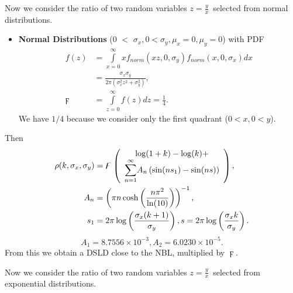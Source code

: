 \documentclass[titlepage,fleqn]{article}%
\begin{document}
Now we consider the ratio of two random variables $z=\frac{y}{x}$\ selected
from normal distributions.

\begin{itemize}
\item \textbf{Normal Distributions} ($0$%
$<$%
$\sigma_{x},0<\sigma_{y},\mu_{x}=0,\mu_{y}=0$) with PDF%
\begin{align*}
f(z)  &  =%
{\displaystyle\int\limits_{x=0}^{\infty}}
xf_{norm}(xz,0,\sigma_{y})f_{norm}(x,0,\sigma_{x})dx\\
&  =\frac{\sigma_{x}\sigma_{y}}{2\pi\left(  \sigma_{x}^{2}z^{2}+\sigma_{y}%
^{2}\right)  },\\
\digamma &  =%
{\displaystyle\int\limits_{z=0}^{\infty}}
f(z)dz=\frac{1}{4}.
\end{align*}
We have $1/4$ because we consider only the first quadrant ($0<x,0<y$).
\end{itemize}

Then%
\begin{align*}
\rho(k,\sigma_{x},\sigma_{y})  &  =\digamma\left(
\begin{array}
[c]{c}%
\log(1+k)-\log(k)+\\%
{\displaystyle\sum\limits_{n=1}^{\infty}}
A_{n}\left(  \sin(ns_{1}\right)  -\sin(ns))
\end{array}
\right)  ,\\
A_{n}  &  =\left(  \pi n\cosh\left(  \frac{n\pi^{2}}{\ln(10)}\right)  \right)
^{-1},\\
s_{1}  &  =2\pi\log\left(  \frac{\sigma_{x}(k+1)}{\sigma_{y}}\right)
,s=2\pi\log\left(  \frac{\sigma_{x}k}{\sigma_{y}}\right)  .
\end{align*}%
\[
A_{1}=8.7556\times10^{-3},A_{2}=6.0230\times10^{-5}.
\]
From this we obtain a DSLD close to the NBL, multiplied by $\digamma$.

Now we consider the ratio of two random variables $z=\frac{y}{x}$\ selected
from exponential distributions.
\end{document}
